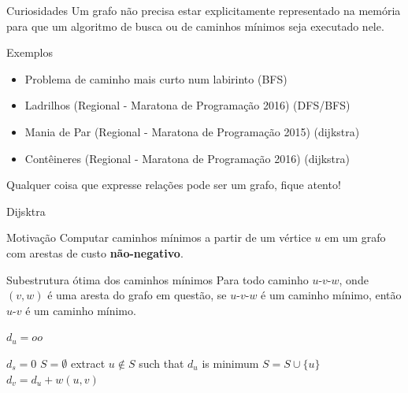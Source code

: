 \begin{frame}
\begin{block}{Curiosidades}
Um grafo não precisa estar explicitamente representado na memória para que um algoritmo de busca ou de caminhos mínimos seja executado nele.
\end{block}

\begin{block}{Exemplos}
\begin{itemize}
    \item Problema de caminho mais curto num labirinto (BFS)
    \item Ladrilhos (Regional - Maratona de Programação 2016) (DFS/BFS)
    \item Mania de Par (Regional - Maratona de Programação 2015) (dijkstra)
    \item Contêineres (Regional - Maratona de Programação 2016) (dijkstra)
\end{itemize}
\end{block}

Qualquer coisa que expresse relações pode ser um grafo, fique atento!
\end{frame}


\begin{frame}{Dijsktra}
\begin{block}{Motivação}
    Computar caminhos mínimos a partir de um vértice $u$ em um grafo com arestas de custo \textbf{não-negativo}.
\end{block}

\begin{block}{Subestrutura ótima dos caminhos mínimos}
    Para todo caminho $u$-$v$-$w$, onde $(v, w)$ é uma aresta do grafo em questão, se $u$-$v$-$w$ é um caminho mínimo, então $u$-$v$ é um caminho mínimo.
\end{block}

\end{frame}


\begin{frame}
\begin{algorithmic}[1]
            \State $d_u = oo$
        \EndFor
        
        \State $d_s = 0$
        \State $S = \emptyset$
            \State extract $u \notin S$ such that $d_u$ is minimum
            \State $S = S \cup \{u\}$
             
                    \State $d_v = d_u + w(u,v)$
                \EndIf
            \EndFor
        \EndWhile
    \EndProcedure
\end{algorithmic}
\end{frame}

